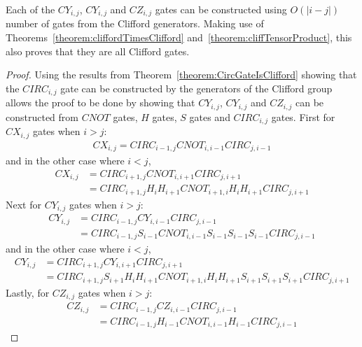 \begin{theorem}
\label{theorem:CUconstructionAndNumberOfGates}
Each of the $\mathit{CY}_{i,j}$, $\mathit{CY}_{i,j}$ and $\mathit{CZ}_{i,j}$ gates can be constructed using $O\left(\lvert i - j \rvert \right)$ number of gates from the Clifford generators. Making use of Theorems~\ref{theorem:cliffordTimesClifford} and~\ref{theorem:cliffTensorProduct}, this also proves that they are all Clifford gates.
\end{theorem}
\begin{proof}
Using the results from Theorem~\ref{theorem:CircGateIsClifford} showing that the $\mathit{CIRC}_{i,j}$ gate can be constructed by the generators of the Clifford group allows the proof to be done by showing that $\mathit{CY}_{i,j}$, $\mathit{CY}_{i,j}$ and $\mathit{CZ}_{i,j}$ can be constructed from $\mathit{CNOT}$ gates, $H$ gates, $S$ gates and $\mathit{CIRC}_{i,j}$ gates. First for $\mathit{CX}_{i,j}$ gates when $i > j$:
\begin{align}
\mathit{CX}_{i,j} = \mathit{CIRC}_{i-1,j}\mathit{CNOT}_{i,i-1}\mathit{CIRC}_{j,i-1}
\end{align}
and in the other case where $i < j$,
\begin{align}
\mathit{CX}_{i,j} &= \mathit{CIRC}_{i+1,j}\mathit{CNOT}_{i,i+1}\mathit{CIRC}_{j,i+1} \\
&= \mathit{CIRC}_{i+1,j}H_{i}H_{i+1}\mathit{CNOT}_{i+1,i}H_{i}H_{i+1}\mathit{CIRC}_{j,i+1}
\end{align}
Next for $\mathit{CY}_{i,j}$ gates when $i > j$:
\begin{align}
\mathit{CY}_{i,j} &= \mathit{CIRC}_{i-1,j}\mathit{CY}_{i,i-1}\mathit{CIRC}_{j,i-1}\\
&= \mathit{CIRC}_{i-1,j}S_{i-1}\mathit{CNOT}_{i,i-1}S_{i-1}S_{i-1}S_{i-1}\mathit{CIRC}_{j,i-1}
\end{align}
and in the other case where $i < j$,
\begin{align}
\mathit{CY}_{i,j} &= \mathit{CIRC}_{i+1,j}\mathit{CY}_{i,i+1}\mathit{CIRC}_{j,i+1}\\
&= \mathit{CIRC}_{i+1,j}S_{i+1}H_{i}H_{i+1}\mathit{CNOT}_{i+1,i}H_{i}H_{i+1}S_{i+1}S_{i+1}S_{i+1}\mathit{CIRC}_{j,i+1}
\end{align}
Lastly, for $\mathit{CZ}_{i,j}$ gates when $i > j$:
\begin{align}
\mathit{CZ}_{i,j} &= \mathit{CIRC}_{i-1,j}\mathit{CZ}_{i,i-1}\mathit{CIRC}_{j,i-1}\\
&= \mathit{CIRC}_{i-1,j}H_{i-1}\mathit{CNOT}_{i,i-1}H_{i-1}\mathit{CIRC}_{j,i-1}

\end{align}
\end{proof}
